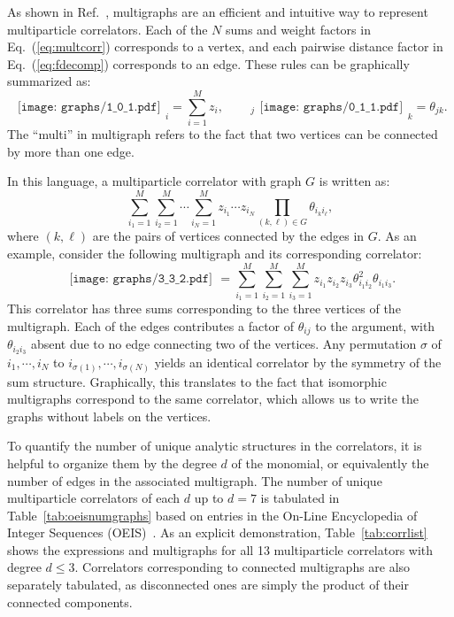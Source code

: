 \documentclass[aps,prd,floatfix,preprintnumbers,twocolumn,groupedaddress,nofootinbib,longbibliography,10pt]{revtex4-1}
\DeclareRobustCommand{\Tab}[1]{Table~\ref{#1}}
\DeclareRobustCommand{\Eq}[1]{Eq.~(\ref{#1})}
\DeclareRobustCommand{\Ref}[1]{Ref.~\cite{#1}}
\DeclareRobustCommand{\dotgraph}[1]{\begin{gathered}\texttt{[image: graphs/1\_0\_1.pdf]}\end{gathered}}
\DeclareRobustCommand{\edgegraph}[1]{\begin{gathered}\texttt{[image: graphs/0\_1\_1.pdf]}\end{gathered}}
\DeclareRobustCommand{\asymwedge}[1]{\begin{gathered}\texttt{[image: graphs/3\_3\_2.pdf]}\end{gathered}}
\begin{document}
As shown in \Ref{Komiske:2017aww}, multigraphs are an efficient and intuitive way to represent multiparticle correlators.
%
Each of the $N$ sums and weight factors in \Eq{eq:multcorr} corresponds to a vertex, and each pairwise distance factor in \Eq{eq:fdecomp} corresponds to an edge.
%
These rules can be graphically summarized as:
%
\begin{equation}
\label{eq:graphrules}
\dotgraph{0.04}_i = \sum_{i=1}^M z_{i}, \quad \quad \,_j\edgegraph{0.2}_k = \theta_{jk}.
\end{equation}
%
The ``multi'' in multigraph refers to the fact that two vertices can be connected by more than one edge.


In this language, a multiparticle correlator with graph $G$ is written as:
\begin{equation}
\label{eq:multcorrG}
\sum_{i_1=1}^M\sum_{i_2=1}^M\cdots\sum_{i_N=1}^Mz_{i_1}\cdots z_{i_N}\prod_{(k,\ell)\in G}\theta_{i_k i_\ell},
\end{equation}
where $(k,\ell)$ are the pairs of vertices connected by the edges in $G$.
%
As an example, consider the following multigraph and its corresponding correlator:
\begin{equation}
\asymwedge{0.16} = \sum_{i_1=1}^M \sum_{i_2=1}^M\sum_{i_3=1}^M z_{i_1}z_{i_2}z_{i_3} \theta_{i_1i_2}^2 \theta_{i_1i_3}.
\end{equation}
%
This correlator has three sums corresponding to the three vertices of the multigraph.
%
Each of the edges contributes a factor of $\theta_{ij}$ to the argument, with $\theta_{i_2i_3}$ absent due to no edge connecting two of the vertices.
%
Any permutation $\sigma$ of $i_1,\cdots,i_N$ to $i_{\sigma(1)},\cdots,i_{\sigma(N)}$ yields an identical correlator by the symmetry of the sum structure.
%
Graphically, this translates to the fact that isomorphic multigraphs correspond to the same correlator, which allows us to write the graphs without labels on the vertices.


To quantify the number of unique analytic structures in the correlators, it is helpful to organize them by the degree $d$ of the monomial, or equivalently the number of edges in the associated multigraph.
%
The number of unique multiparticle correlators of each $d$ up to $d=7$ is tabulated in \Tab{tab:oeisnumgraphs} based on entries in the On-Line Encyclopedia of Integer Sequences (OEIS)~\cite{oeis}.
%
As an explicit demonstration, \Tab{tab:corrlist} shows the expressions and multigraphs for all 13 multiparticle correlators with degree $d\le 3$.
%
Correlators corresponding to connected multigraphs are also separately tabulated, as disconnected ones are simply the product of their connected components.
\end{document}
